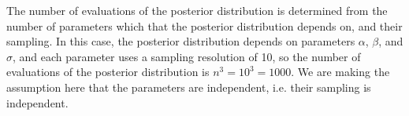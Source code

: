 The number of evaluations of the posterior distribution is determined from the number of parameters which that the posterior distribution depends on, and their sampling. In this case, the posterior distribution depends on parameters $\alpha$, $\beta$, and $\sigma$, and each parameter uses a sampling resolution of 10, so the number of evaluations of the posterior distribution is $n^3=10^3=1000$. We are making the assumption here that the parameters are independent, i.e. their sampling is independent.